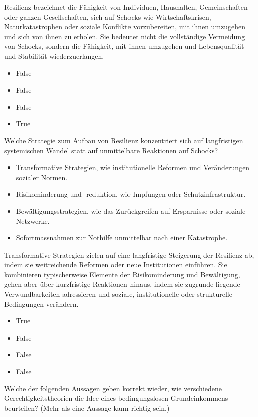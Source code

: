 \documentclass[
  nswissgerman,
  a4paper,
  DIV=11,
  numbers=noendperiod,
  oneside,
  openany]{scrreprt}
\providecommand{\tightlist}{%
  \setlength{\itemsep}{0pt}\setlength{\parskip}{0pt}}
\begin{document}
Resilienz bezeichnet die Fähigkeit von Individuen, Haushalten,
Gemeinschaften oder ganzen Gesellschaften, sich auf Schocks wie
Wirtschaftskrisen, Naturkatastrophen oder soziale Konflikte
vorzubereiten, mit ihnen umzugehen und sich von ihnen zu erholen. Sie
bedeutet nicht die vollständige Vermeidung von Schocks, sondern die
Fähigkeit, mit ihnen umzugehen und Lebensqualität und Stabilität
wiederzuerlangen.

\begin{itemize}
\tightlist
\item
  False
\item
  False
\item
  False
\item
  True
\end{itemize}

Welche Strategie zum Aufbau von Resilienz konzentriert sich auf
langfristigen systemischen Wandel statt auf unmittelbare Reaktionen auf
Schocks?

\begin{itemize}
\tightlist
\item[$\square$]
  Transformative Strategien, wie institutionelle Reformen und
  Veränderungen sozialer Normen.
\item[$\square$]
  Risikominderung und -reduktion, wie Impfungen oder
  Schutzinfrastruktur.
\item[$\square$]
  Bewältigungsstrategien, wie das Zurückgreifen auf Ersparnisse oder
  soziale Netzwerke.
\item[$\square$]
  Sofortmassnahmen zur Nothilfe unmittelbar nach einer Katastrophe.
\end{itemize}

Transformative Strategien zielen auf eine langfristige Steigerung der
Resilienz ab, indem sie weitreichende Reformen oder neue Institutionen
einführen. Sie kombinieren typischerweise Elemente der Risikominderung
und Bewältigung, gehen aber über kurzfristige Reaktionen hinaus, indem
sie zugrunde liegende Verwundbarkeiten adressieren und soziale,
institutionelle oder strukturelle Bedingungen verändern.

\begin{itemize}
\tightlist
\item
  True
\item
  False
\item
  False
\item
  False
\end{itemize}

Welche der folgenden Aussagen geben korrekt wieder, wie verschiedene
Gerechtigkeitstheorien die Idee eines bedingungslosen Grundeinkommens
beurteilen? (Mehr als eine Aussage kann richtig sein.)
\end{document}
